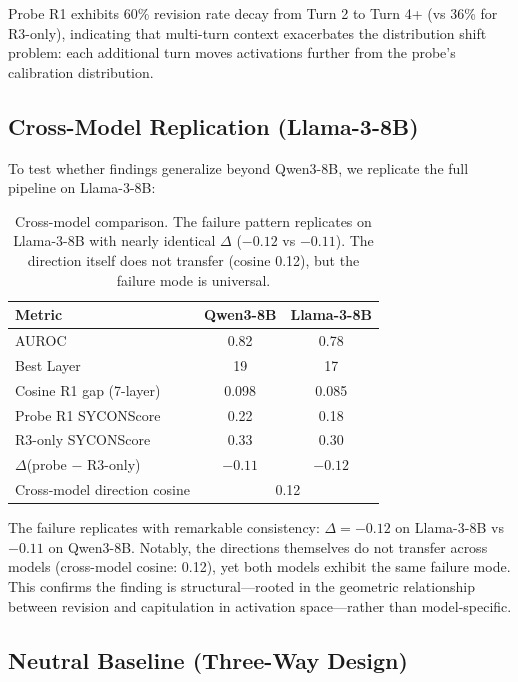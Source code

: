 \documentclass[11pt,a4paper]{article}
\begin{document}
Probe R1 exhibits 60\% revision rate decay from Turn 2 to Turn 4+ (vs 36\% for R3-only), indicating that multi-turn context exacerbates the distribution shift problem: each additional turn moves activations further from the probe's calibration distribution.

\subsection{Cross-Model Replication (Llama-3-8B)}

To test whether findings generalize beyond Qwen3-8B, we replicate the full pipeline on Llama-3-8B:

\begin{table}[h]
\centering
\small
\begin{tabular}{lcc}
\toprule
\textbf{Metric} & \textbf{Qwen3-8B} & \textbf{Llama-3-8B} \\
\midrule
AUROC & 0.82 & 0.78 \\
Best Layer & 19 & 17 \\
Cosine R1 gap (7-layer) & 0.098 & 0.085 \\
Probe R1 SYCONScore & 0.22 & 0.18 \\
R3-only SYCONScore & 0.33 & 0.30 \\
$\Delta$(probe $-$ R3-only) & $-0.11$ & $-0.12$ \\
\midrule
Cross-model direction cosine & \multicolumn{2}{c}{0.12} \\
\bottomrule
\end{tabular}
\caption{Cross-model comparison. The failure pattern replicates on Llama-3-8B with nearly identical $\Delta$ ($-0.12$ vs $-0.11$). The direction itself does not transfer (cosine 0.12), but the failure mode is universal.}
\label{tab:cross_model}
\end{table}

The failure replicates with remarkable consistency: $\Delta=-0.12$ on Llama-3-8B vs $-0.11$ on Qwen3-8B. Notably, the directions themselves do not transfer across models (cross-model cosine: 0.12), yet both models exhibit the same failure mode. This confirms the finding is structural---rooted in the geometric relationship between revision and capitulation in activation space---rather than model-specific.

\subsection{Neutral Baseline (Three-Way Design)}
\end{document}
